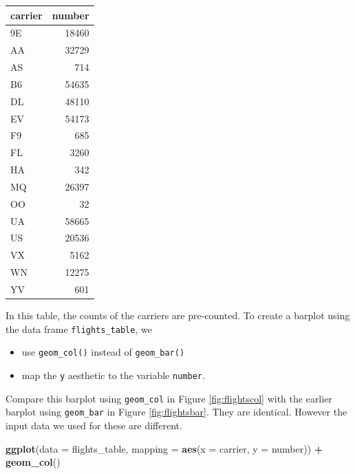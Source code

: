 \documentclass[12pt,]{krantz}
\makeatletter
\newenvironment{Shaded}{\begin{snugshade}}{\end{snugshade}}
\newcommand{\KeywordTok}[1]{\textcolor[rgb]{0.27,0.27,0.27}{\textbf{#1}}}
\newcommand{\DataTypeTok}[1]{\textcolor[rgb]{0.27,0.27,0.27}{#1}}
\newcommand{\StringTok}[1]{\textcolor[rgb]{0.5,0.5,0.5}{#1}}
\newcommand{\OperatorTok}[1]{\textcolor[rgb]{0.43,0.43,0.43}{\textbf{#1}}}
\newcommand{\NormalTok}[1]{#1}
\providecommand{\tightlist}{%
  \setlength{\itemsep}{0pt}\setlength{\parskip}{0pt}}
\newenvironment{kframe}{%
\medskip{}
\setlength{\fboxsep}{.8em}
 \def\at@end@of@kframe{}%
 \ifinner\ifhmode%
  \def\at@end@of@kframe{\end{minipage}}%
  \begin{minipage}{\columnwidth}%
 \fi\fi%
 \def\FrameCommand##1{\hskip\@totalleftmargin \hskip-\fboxsep
 \colorbox{shadecolor}{##1}\hskip-\fboxsep
     \hskip-\linewidth \hskip-\@totalleftmargin \hskip\columnwidth}%
 \MakeFramed {\advance\hsize-\width
   \@totalleftmargin\z@ \linewidth\hsize
   \@setminipage}}%
 {\par\unskip\endMakeFramed%
 \at@end@of@kframe}
\renewenvironment{Shaded}{\begin{kframe}}{\end{kframe}}
\theoremstyle{definition}
\theoremstyle{definition}
\theoremstyle{definition}
\theoremstyle{remark}
\makeatother
\begin{document}
\begin{table}[H]
\centering\begingroup\fontsize{10}{12}\selectfont

\begin{tabular}{l|r}
\hline
carrier & number\\
\hline
9E & 18460\\
\hline
AA & 32729\\
\hline
AS & 714\\
\hline
B6 & 54635\\
\hline
DL & 48110\\
\hline
EV & 54173\\
\hline
F9 & 685\\
\hline
FL & 3260\\
\hline
HA & 342\\
\hline
MQ & 26397\\
\hline
OO & 32\\
\hline
UA & 58665\\
\hline
US & 20536\\
\hline
VX & 5162\\
\hline
WN & 12275\\
\hline
YV & 601\\
\hline
\end{tabular}\endgroup{}
\end{table}

In this table, the counts of the carriers are pre-counted. To create a
barplot using the data frame \texttt{flights\_table}, we

\begin{itemize}
\tightlist
\item
  use \texttt{geom\_col()} instead of \texttt{geom\_bar()}
\item
  map the \texttt{y} aesthetic to the variable \texttt{number}.
\end{itemize}

Compare this barplot using \texttt{geom\_col} in Figure
\ref{fig:flightscol} with the earlier barplot using \texttt{geom\_bar}
in Figure \ref{fig:flightsbar}. They are identical. However the input
data we used for these are different.




\begin{Shaded}
\begin{Highlighting}[]
\KeywordTok{ggplot}\NormalTok{(}\DataTypeTok{data =}\NormalTok{ flights_table, }\DataTypeTok{mapping =} \KeywordTok{aes}\NormalTok{(}\DataTypeTok{x =}\NormalTok{ carrier, }\DataTypeTok{y =}\NormalTok{ number)) }\OperatorTok{+}
\StringTok{  }\KeywordTok{geom_col}\NormalTok{()}
\end{Highlighting}
\end{Shaded}
\end{document}
